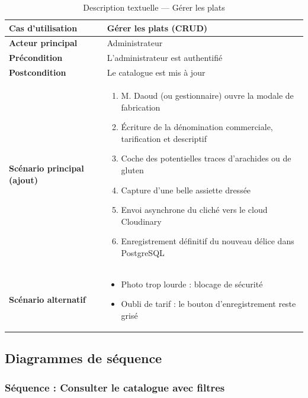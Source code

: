 \begin{table}[H]
    \centering
    \caption{Description textuelle --- Gérer les plats}
    \label{tab:desc_gerer_plats}
    \renewcommand{\arraystretch}{1.3}
    \begin{tabular}{|p{4cm}|p{8.5cm}|}
        \hline
        \textbf{Cas d'utilisation} & Gérer les plats (CRUD) \\
        \hline
        \textbf{Acteur principal} & Administrateur \\
        \hline
        \textbf{Précondition} & L'administrateur est authentifié \\
        \hline
        \textbf{Postcondition} & Le catalogue est mis à jour \\
        \hline
        \textbf{Scénario principal (ajout)} &
        \begin{enumerate}
            \item M. Daoud (ou gestionnaire) ouvre la modale de fabrication
            \item Écriture de la dénomination commerciale, tarification et descriptif
            \item Coche des potentielles traces d'arachides ou de gluten
            \item Capture d'une belle assiette dressée
            \item Envoi asynchrone du cliché vers le cloud Cloudinary
            \item Enregistrement définitif du nouveau délice dans PostgreSQL
        \end{enumerate} \\
        \hline
        \textbf{Scénario alternatif} &
        \begin{itemize}
            \item[4a.] Photo trop lourde : blocage de sécurité
            \item[2a.] Oubli de tarif : le bouton d'enregistrement reste grisé
        \end{itemize} \\
        \hline
    \end{tabular}
\end{table}

\subsection{Diagrammes de séquence}

\subsubsection{Séquence : Consulter le catalogue avec filtres}

